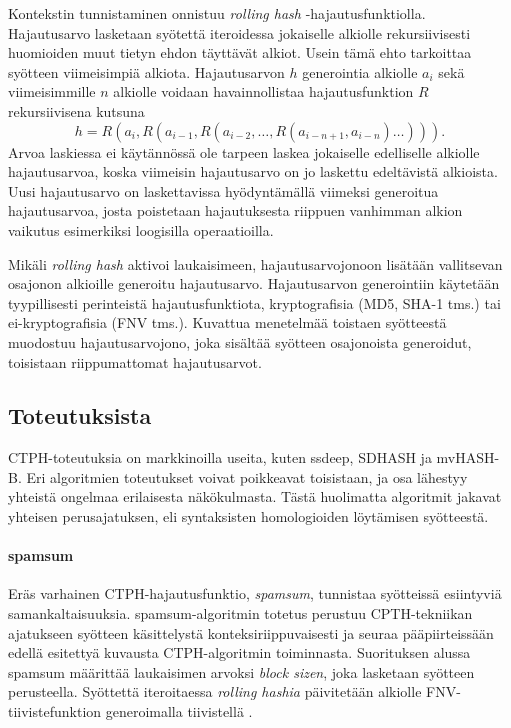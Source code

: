 \documentclass[10pt]{article}
\begin{document}
	Kontekstin tunnistaminen onnistuu \textit{rolling hash} -hajautusfunktiolla. Hajautusarvo
	lasketaan syötettä iteroidessa jokaiselle alkiolle rekursiivisesti huomioiden muut tietyn
	ehdon täyttävät alkiot. Usein tämä ehto tarkoittaa syötteen viimeisimpiä alkiota.
	Hajautusarvon $h$ generointia alkiolle $a_i$ sekä viimeisimmille $n$ alkiolle voidaan
	havainnollistaa hajautusfunktion $R$ rekursiivisena kutsuna 
	\[h = R(a_i, R(a_{i-1}, R(a_{i-2}, \ldots, R(a_{i - n + 1}, a_{i - n}) \ldots ))).\]
	Arvoa laskiessa ei käytännössä ole tarpeen laskea jokaiselle edelliselle alkiolle
	hajautusarvoa, koska viimeisin hajautusarvo on
	jo laskettu edeltävistä alkioista. Uusi hajautusarvo on laskettavissa
	hyödyntämällä viimeksi generoitua hajautusarvoa, josta poistetaan
	hajautuksesta riippuen vanhimman alkion vaikutus esimerkiksi loogisilla operaatioilla.

	Mikäli \textit{rolling hash} aktivoi laukaisimeen,
	hajautusarvojonoon lisätään vallitsevan osajonon
	alkioille generoitu hajautusarvo.
	Hajautusarvon generointiin käytetään tyypillisesti perinteistä
	hajautusfunktiota, kryptografisia (MD5, SHA-1 tms.) tai ei-kryptografisia (FNV tms.).
	Kuvattua menetelmää toistaen syötteestä muodostuu hajautusarvojono,
		joka sisältää syötteen osajonoista generoidut, toisistaan
		riippumattomat hajautusarvot.

	\subsection*{Toteutuksista}

	CTPH-toteutuksia on markkinoilla useita, kuten ssdeep, SDHASH ja mvHASH-B.
	Eri algoritmien toteutukset voivat poikkeavat toisistaan, ja osa lähestyy
	yhteistä ongelmaa erilaisesta näkökulmasta. Tästä huolimatta algoritmit
	jakavat yhteisen perusajatuksen, eli syntaksisten homologioiden löytämisen
	syötteestä.

	\paragraph{spamsum}
	Eräs varhainen CTPH-hajautusfunktio, \textit{spamsum}, tunnistaa
	syötteissä esiintyviä samankaltaisuuksia. spamsum-algoritmin
	totetus perustuu CPTH-tekniikan ajatukseen syötteen käsittelystä konteksiriippuvaisesti
	ja seuraa pääpiirteissään edellä esitettyä kuvausta CTPH-algoritmin toiminnasta.
	Suorituksen alussa spamsum määrittää laukaisimen arvoksi \textit{block sizen},
	joka lasketaan syötteen perusteella.
	Syöttettä iteroitaessa \textit{rolling hashia} päivitetään alkiolle FNV-tiivistefunktion
	generoimalla tiivistellä \parencite{IDENT}. 
\end{document}
